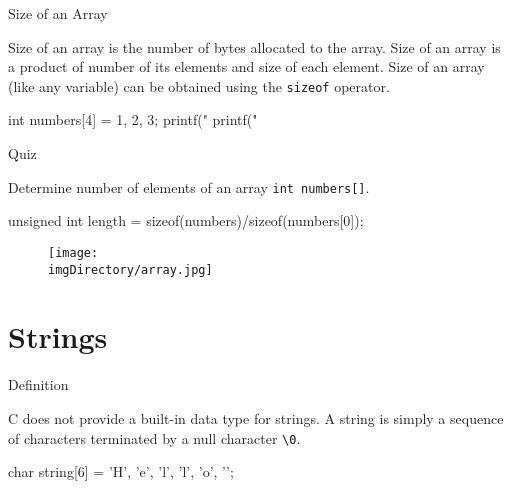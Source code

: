 \documentclass[compress]{beamer}
\begin{document}
\begin{slide}
	\begin{block}{Size of an Array}

	Size of an array is the number of bytes allocated to the array.
	Size of an array is a product of number of its elements and size of each element.
	Size of an array (like any variable) can be obtained using the \alert{\texttt{sizeof}} operator.

	\begin{terminal}
	int numbers[4] = {1, 2, 3};
	printf("%
	printf("%
	\end{terminal}

	\end{block}
\end{slide}

\begin{slide}
	\begin{block}{Quiz}

	Determine number of elements of an array \texttt{int numbers[]}.

	\pause

	\begin{terminal}
	unsigned int length = sizeof(numbers)/sizeof(numbers[0]);
	\end{terminal}

	\end{block}
\end{slide}

\begin{slide}
	\begin{figure}
	\texttt{[image: \\imgDirectory/array.jpg]}
	\end{figure}
\end{slide}

\section{Strings}

\begin{slide}
	\begin{block}{Definition}

	C does not provide a built-in data type for strings.
	A string is simply a sequence of characters terminated by a null character \alert{\texttt{\textbackslash 0}}.

	\begin{terminal}
	char string[6] = {'H', 'e', 'l', 'l', 'o', '\0'};
	\end{terminal}

	\end{block}
\end{slide}
\end{document}
